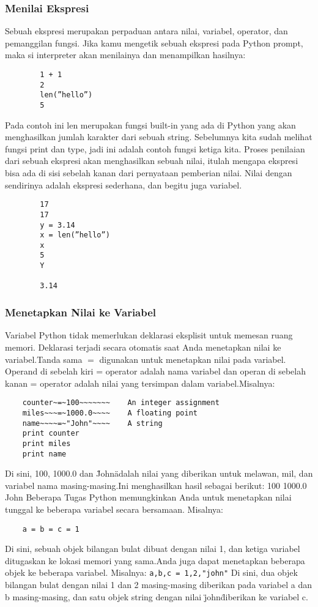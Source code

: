 \subsubsection{Menilai Ekspresi}
	Sebuah ekspresi merupakan perpaduan antara nilai, variabel, operator, dan pemanggilan fungsi. Jika kamu mengetik sebuah ekspresi pada Python prompt, maka si interpreter akan menilainya dan menampilkan hasilnya:
	\begin{verbatim}
		1 + 1 
		2 
		len(”hello”) 
		5 
	\end{verbatim}
Pada contoh ini len merupakan fungsi built-in yang ada di Python yang akan menghasilkan jumlah karakter dari sebuah string. Sebelumnya kita sudah melihat fungsi print dan type, jadi ini adalah contoh fungsi ketiga kita.
Proses penilaian dari sebuah ekspresi akan menghasilkan sebuah nilai, itulah mengapa ekspresi bisa ada di sisi sebelah kanan dari pernyataan pemberian nilai. Nilai dengan sendirinya adalah ekspresi sederhana, dan begitu juga variabel.
	\begin{verbatim}
		17
		17 
		y = 3.14 
		x = len(”hello”) 
		x 
		5 
		Y

		3.14
	\end{verbatim}
	
\subsubsection{Menetapkan Nilai ke Variabel}
	Variabel Python tidak memerlukan deklarasi eksplisit untuk memesan ruang memori. Deklarasi terjadi secara otomatis saat Anda menetapkan nilai ke variabel.Tanda sama \(=\) digunakan untuk menetapkan nilai pada variabel. 
Operand di sebelah kiri = operator adalah nama variabel dan operan di sebelah kanan = operator adalah nilai yang tersimpan dalam variabel.Misalnya:
\begin{verbatim}
	counter~=~100~~~~~~~    An integer assignment 
	miles~~~=~1000.0~~~~    A floating point 
	name~~~~=~"John"~~~~    A string 
	print counter 
	print miles 
	print name
\end{verbatim}
Di sini, 100, 1000.0 dan \"John\" adalah nilai yang diberikan untuk melawan, mil, dan variabel nama masing-masing.Ini menghasilkan hasil sebagai berikut:
	100 
	1000.0
	John 
	Beberapa Tugas 
Python memungkinkan Anda untuk menetapkan nilai tunggal ke beberapa variabel secara bersamaan. 
Misalnya:
\begin{verbatim}
	a = b = c = 1
\end{verbatim}
Di sini, sebuah objek bilangan bulat dibuat dengan nilai 1, dan ketiga variabel ditugaskan ke lokasi memori yang sama.Anda juga dapat menetapkan beberapa objek ke beberapa variabel. 
Misalnya:
	\verb|a,b,c = 1,2,"john"| 
Di sini, dua objek bilangan bulat dengan nilai 1 dan 2 masing-masing diberikan pada variabel a dan b masing-masing, dan satu objek string dengan nilai \"john\" diberikan ke variabel c. 

